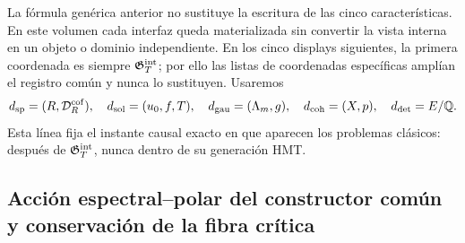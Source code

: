 La fórmula genérica anterior no sustituye la escritura de las cinco características.
En este volumen cada interfaz queda materializada sin convertir la vista interna en
un objeto o dominio independiente. En los cinco displays siguientes, la primera
coordenada es siempre $\mathfrak G_T^{\rm int}$; por ello las listas de coordenadas
específicas amplían el registro común y nunca lo sustituyen.
Usaremos
\[
 d_{\rm sp}=(R,\mathcal D_R^{\rm cof}),\quad
 d_{\rm sol}=(u_0,f,T),\quad
 d_{\rm gau}=(\Lambda_m,g),\quad
 d_{\rm coh}=(X,p),\quad
 d_{\rm det}=E/\mathbb Q.
\]
Esta línea fija el instante causal exacto en que aparecen los problemas clásicos:
después de \(\mathfrak G_T^{\rm int}\), nunca dentro de su generación HMT.

\subsection{Acción espectral–polar del constructor común y conservación de la fibra crítica}

